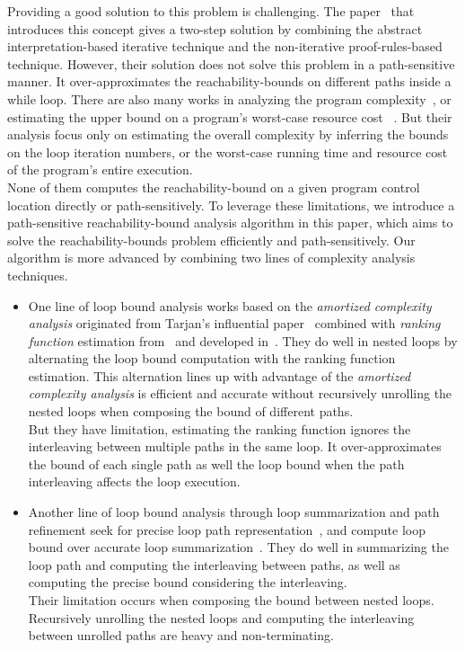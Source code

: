 Providing a good solution to this problem is challenging.
The paper~\cite{GulwaniZ10} that introduces this concept
gives a two-step solution by combining the abstract interpretation-based iterative technique
 and the non-iterative proof-rules-based technique.
 However, their solution
does not solve this problem in a path-sensitive manner.
It over-approximates the reachability-bounds on different paths inside a while loop.
 There are also many works in analyzing the program complexity~\cite{GustafssonEL05, HumenbergerJK18},
 or estimating the upper bound on a program's worst-case resource cost
~\cite{BrockschmidtEFFG16, AlbertAGP08, AliasDFG10, Flores-MontoyaH14}.
But their analysis
focus only on estimating 
the overall complexity 
by inferring the bounds on the loop iteration numbers,
 or the worst-case running time and resource cost of the program's entire execution.
 \\
 None of them computes the reachability-bound on a given program control location directly or path-sensitively.
 To leverage these limitations,
we introduce a path-sensitive reachability-bound analysis algorithm in this paper, which aims to solve 
the reachability-bounds problem efficiently and path-sensitively.
Our algorithm is more advanced by combining two lines of complexity analysis techniques.
 \begin{itemize}
 \item One line of loop bound analysis works based on the \emph{amortized complexity analysis} originated from Tarjan's influential paper~\cite{PotechinP17} combined with \emph{ranking function} estimation from~\cite{BradleyMS05} and developed in~\cite{ZulegerGSV11,SinnZV14,SinnZV17,LuCT21,AliasDFG10}.
 They do well in nested loops by alternating the loop bound computation with the ranking function estimation. This alternation lines up with advantage of the \emph{amortized complexity analysis} is efficient and accurate without recursively unrolling the nested loops when composing the bound of different paths.
 \\
But they have limitation, estimating the ranking function ignores the interleaving between multiple paths in the same loop.
It over-approximates the bound of each single path as well the loop bound when the path interleaving affects the loop execution.
\item 
Another line of loop bound analysis through loop summarization and path refinement seek for precise loop path representation~\cite{ManoliosV06, BalakrishnanSIG09, SharmaDDA11, Flores-MontoyaH14, HumenbergerJK18, CyphertBKR19}, and compute loop bound over accurate loop summarization~\cite{GulwaniJK09, ZulegerGSV11}.
They do well in summarizing the loop path and computing the interleaving between paths, as well as computing the precise bound considering the interleaving.
\\
Their limitation occurs when composing the bound between nested loops. Recursively unrolling the nested loops and computing the interleaving between unrolled paths are heavy and non-terminating.
 \end{itemize}
